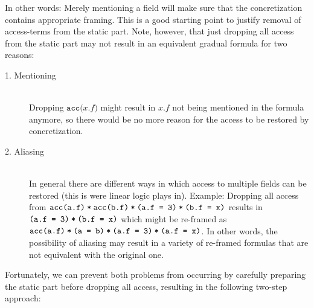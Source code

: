 \documentclass[11pt,a4paper]{article}
\newcommand{\ttt}{\texttt}
\newcommand{\edot}[2]{\ttt{#1.#2}}
\newcommand{\phiCons}[2]{\ttt{#1\:*\:#2}}
\newcommand{\phiEq}[2]{\ttt{(#1 = #2)}}
\newcommand{\phiAcc}[2]{\ttt{acc(#1.#2)}}
\begin{document}
In other words: Merely mentioning a field will make sure that the concretization contains appropriate framing.
This is a good starting point to justify removal of access-terms from the static part.
Note, however, that just dropping all access from the static part may not result in an equivalent gradual formula for two reasons:
\begin{description}
	\item[1. Mentioning]~\\
	Dropping $\phiAcc{$x$}{$f$}$ might result in $\edot{$x$}{$f$}$ not being mentioned in the formula anymore, so there would be no more reason for the access to be restored by concretization.
	
	\item[2. Aliasing]~\\
	In general there are different ways in which access to multiple fields can be restored (this is were linear logic plays in).
	Example: Dropping all access from $\phiCons{\phiCons{\phiAcc{a}{f}}{\phiAcc{b}{f}}}{\phiCons{\phiEq{a.f}{3}}{\phiEq{b.f}{x}}}$
	results in
	$\phiCons{\phiEq{a.f}{3}}{\phiEq{b.f}{x}}$
	which might be re-framed as
	$\phiCons{\phiCons{\phiAcc{a}{f}}{\phiEq{a}{b}}}{\phiCons{\phiEq{a.f}{3}}{\phiEq{a.f}{x}}}$.
	In other words, the possibility of aliasing may result in a variety of re-framed formulas that are not equivalent with the original one.
\end{description}

Fortunately, we can prevent both problems from occurring by carefully preparing the static part before dropping all access, resulting in the following two-step approach:
\end{document}

